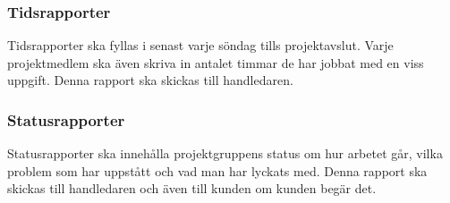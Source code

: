 \subsubsection{Tidsrapporter}
Tidsrapporter ska fyllas i senast varje söndag tills projektavslut. Varje projektmedlem ska även skriva in antalet timmar de har jobbat med en viss uppgift. Denna rapport ska skickas till handledaren.

\subsubsection{Statusrapporter}
Statusrapporter ska innehålla projektgruppens status om hur arbetet går, vilka problem som har uppstått och vad man har lyckats med. Denna rapport ska skickas till handledaren och även till kunden om kunden begär det. 
